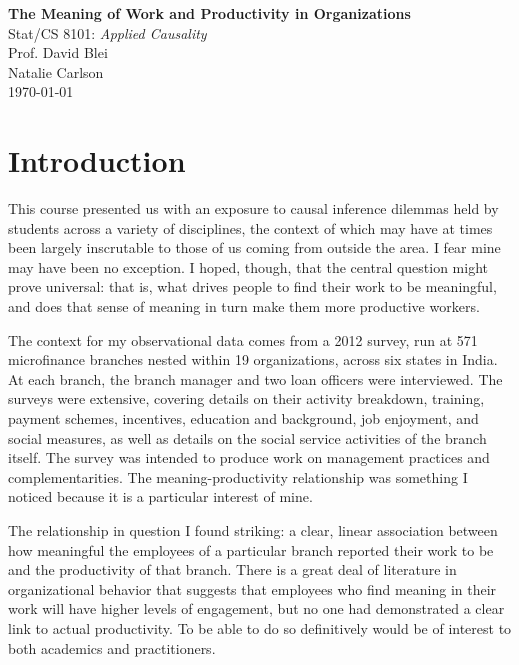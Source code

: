 \documentclass[12pt]{article}
\begin{document}
\begin{center}
  \Large \textbf{The Meaning of Work and Productivity in Organizations} \\
  \vspace{0.1in}
  \large Stat/CS 8101: \textit{Applied Causality} \\
  \large Prof. David Blei \\
  \vspace{0.1in}
  \normalsize Natalie Carlson \\
  \today
\end{center}


\section{Introduction}

This course presented us with an exposure to causal inference dilemmas held by students across a variety of disciplines, the context of which may have at times been largely inscrutable to those of us coming from outside the area. I fear mine may have been no exception. I hoped, though, that the central question might prove universal: that is, what drives people to find their work to be meaningful, and does that sense of meaning in turn make them more productive workers. 

The context for my observational data comes from a 2012 survey, run at 571 microfinance branches nested within 19 organizations, across six states in India. At each branch, the branch manager and two loan officers were interviewed. The surveys were extensive, covering details on their activity breakdown, training, payment schemes, incentives, education and background, job enjoyment, and social measures, as well as details on the social service activities of the branch itself. The survey was intended to produce work on management practices and complementarities. The meaning-productivity relationship was something I noticed because it is a particular interest of mine.

The relationship in question I found striking: a clear, linear association between how meaningful the employees of a particular branch reported their work to be and the productivity of that branch. There is a great deal of literature in organizational behavior that suggests that employees who find meaning in their work will have higher levels of engagement, but no one had demonstrated a clear link to actual productivity. To be able to do so definitively would be of interest to both academics and practitioners.
\end{document}
